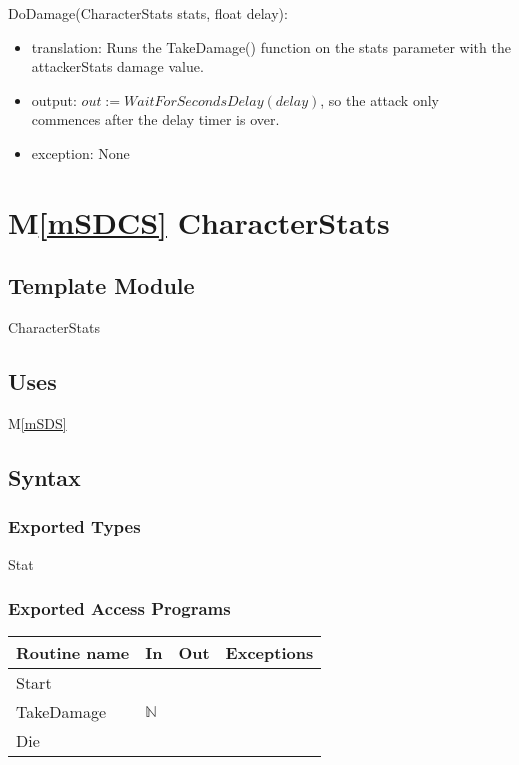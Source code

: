\documentclass[12pt]{article}
\newcommand{\mref}[1]{M\ref{#1}}
\begin{document}
\noindent DoDamage(CharacterStats stats, float delay):
\begin{itemize}
\item translation: Runs the TakeDamage() function on the stats parameter with the attackerStats damage value.
\item output: $out := WaitForSecondsDelay(delay)$, so the attack only commences after the delay timer is over.
\item exception: None
\end{itemize}

\newpage

\section* {\mref{mSDCS} CharacterStats}

\subsection*{Template Module}

CharacterStats

\subsection* {Uses}

\mref{mSDS}

\subsection* {Syntax}

\subsubsection* {Exported Types}

Stat

\subsubsection* {Exported Access Programs}

\begin{tabular}{| l | l | l | l |}
\hline
\textbf{Routine name} & \textbf{In} & \textbf{Out} & \textbf{Exceptions}\\
\hline
Start & ~ & ~  & ~\\
TakeDamage & $\mathbb{N}$  & ~ & ~\\
Die & ~  & ~ & ~\\
\hline
\end{tabular}
\end{document}
